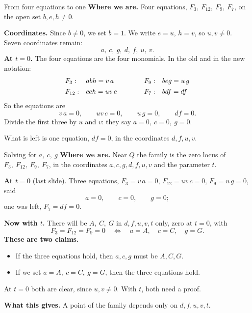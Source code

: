 \begin{frame}{From four equations to one}
\textbf{Where we are.} Four equations, \(F_3,\ F_{12},\ F_9,\ F_7\), on the open set \(b,e,h\ne0\).
\par\smallskip
\textbf{Coordinates.} Since \(b\ne0\), we set \(b=1\). We write \(e=u\), \(h=v\), so \(u,v\ne0\). Seven coordinates remain:
\[
a,\ c,\ g,\ d,\ f,\ u,\ v.
\]
\textbf{At \(t=0\).} The four equations are the four monomials. In the old and in the new notation:
\[
\begin{array}{l@{\quad}l@{\qquad\qquad}l@{\quad}l}
F_3:& abh=v\,a & F_9:& beg=u\,g\\[4pt]
F_{12}:& ceh=uv\,c & F_7:& bdf=df
\end{array}
\]
So the equations are
\[
v\,a=0,\qquad uv\,c=0,\qquad u\,g=0,\qquad df=0.
\]
Divide the first three by \(u\) and \(v\): they say \(a=0,\ c=0,\ g=0\).
\par\medskip
What is left is one equation, \(df=0\), in the coordinates \(d,f,u,v\).
\end{frame}

\begin{frame}{Solving for \(a,\ c,\ g\)}
\textbf{Where we are.} Near \(Q\) the family is the zero locus of \(F_3,\ F_{12},\ F_9,\ F_7\), in the coordinates \(a,c,g,d,f,u,v\) and the parameter \(t\).
\par
\textbf{At \(t=0\)} (last slide). Three equations, \(F_3=v\,a=0\), \(F_{12}=uv\,c=0\), \(F_9=u\,g=0\), said
\[
a=0,\qquad c=0,\qquad g=0;
\]
one was left, \(F_7=df=0\).
\par
\textbf{Now with \(t\).} There will be \(A,\ C,\ G\) in \(d,f,u,v,t\) only, zero at \(t=0\), with
\[
\boxed{F_3=F_{12}=F_9=0\quad\Longleftrightarrow\quad a=A,\quad c=C,\quad g=G.}
\]
\textbf{These are two claims.}
\begin{itemize}
\setlength{\itemsep}{0pt}
\item[\(\Rightarrow\)] If the three equations hold, then \(a,c,g\) must be \(A,C,G\).
\item[\(\Leftarrow\)] If we set \(a=A,\ c=C,\ g=G\), then the three equations hold.
\end{itemize}
At \(t=0\) both are clear, since \(u,v\ne0\). With \(t\), both need a proof.
\par
\textbf{What this gives.} A point of the family depends only on \(d,f,u,v,t\).
\end{frame}

